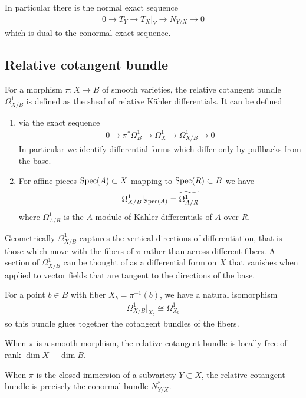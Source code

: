\documentclass[12pt]{article}
\begin{document}
In particular there is the normal exact sequence
\begin{align*}
     0 \to T_Y \to T_X\vert_Y \to N_{Y/X} \to 0
\end{align*} which is dual to the conormal exact sequence.

\subsection{Relative cotangent bundle}
For a morphism $\pi:X\to B$ of smooth varieties, the relative cotangent bundle $\Omega^1_{X/B}$ is defined as the sheaf of relative Kähler differentials. It can be defined 
\begin{enumerate}
    \item via the exact sequence
    \begin{align*}
        0 \to \pi^*\Omega^1_B \to \Omega^1_X \to \Omega^1_{X/B} \to 0
    \end{align*} In particular we identify differential forms which differ only by pullbacks from the base.
    \item For affine pieces $\operatorname{Spec}(A) \subset X$ mapping to $\operatorname{Spec}(R)\subset B$ we have \begin{align*}
        \Omega^1_{X/B}\vert_{\operatorname{Spec}(A)} = \widetilde{\Omega^1_{A/R}} 
    \end{align*} where $\Omega^1_{A/R}$ is the $A$-module of Kähler differentials of $A$ over $R$.
\end{enumerate} 

Geometrically $\Omega^1_{X/B}$ captures the vertical directions of differentiation, that is those which move with the fibers of $\pi$ rather than across different fibers. A section of $\Omega^1_{X/B}$ can be thought of as a differential form on $X$ that vanishes when applied to vector fields that are tangent to the directions of the base.

For a point $b\in B$ with fiber $X_b = \pi^{-1}(b)$, we have a natural isomorphism \begin{align*}
    \Omega^1_{X/B}\vert_{X_b} \cong \Omega^1_{X_b}
\end{align*} so this bundle glues together the cotangent bundles of the fibers.

\begin{remark}
    When $\pi$ is a smooth morphism, the relative cotangent bundle is locally free of rank $\dim X - \dim B$.

    When $\pi$ is the closed immersion of a subvariety $Y\subset X$, the relative cotangent bundle is precisely the conormal bundle $N^*_{Y/X}$.
\end{remark}
\end{document}
